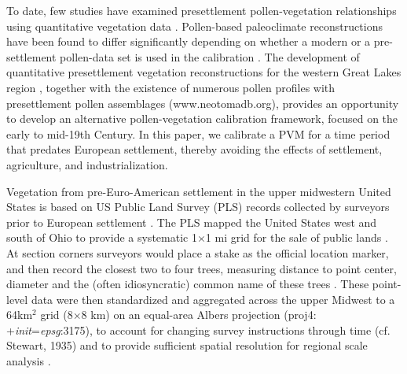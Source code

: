 \documentclass[12pt]{article}
\begin{document}
To date, few studies have examined presettlement pollen-vegetation
relationships using quantitative vegetation data
\citep{schwartz1989predicting}.  Pollen-based paleoclimate
reconstructions have been found to differ significantly depending on
whether a modern or a pre-settlement pollen-data set is used in the
calibration \citep{st2014bias}.  The development of quantitative
presettlement vegetation reconstructions for the western Great Lakes
region \citep{goring_witness}, together with the existence of numerous
pollen profiles with presettlement pollen assemblages
(www.neotomadb.org), provides an opportunity to develop an alternative
pollen-vegetation calibration framework, focused on the early to
mid-19th Century.  In this paper, we calibrate a PVM for a time period
that predates European settlement, thereby avoiding the effects of
settlement, agriculture, and industrialization.

Vegetation from pre-Euro-American settlement in the upper midwestern
United States is based on US Public Land Survey (PLS) records
collected by surveyors prior to European settlement
\citep{bourdo1956review, schulte2001original,
  almendinger1996minnesota}. The PLS mapped the United States west and
south of Ohio to provide a systematic 1$\times$1 mi grid for the sale
of public lands \citep{stewart1935public, white1983history}. At
section corners surveyors would place a stake as the official location
marker, and then record the closest two to four trees, measuring
distance to point center, diameter and the (often idiosyncratic)
common name of these trees \citep{mladenoff2002narrowing}.  These
point-level data were then standardized and aggregated across the
upper Midwest to a 64km$^2$ grid (8$\times$8 km) on an equal-area
Albers projection (proj4: +\textit{init}=\textit{epsg}:3175), to
account for changing survey instructions through time (cf. Stewart,
1935) and to provide sufficient spatial resolution for regional scale
analysis \citep{goring_witness}.
\end{document}
